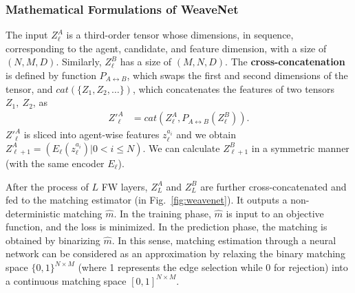 \subsubsection{Mathematical Formulations of WeaveNet}
The input $Z^A_\ell$ is a third-order tensor whose dimensions, in sequence, corresponding to the agent, candidate, and feature dimension, with a size of $(N, M, D)$.
Similarly, $Z^B_\ell$ has a size of $(M, N, D)$.
The {\bf cross-concatenation} is defined by function $P_{A\leftrightarrow B}$, which swaps the first and second dimensions of the tensor, and $cat(\{Z_1,Z_2,\ldots\})$, which concatenates the features of two tensors $Z_1,~Z_2$, as
\begin{equation}
\begin{split}
 Z'^A_\ell &= cat(Z^A_\ell,P_{A\leftrightarrow B}(Z^B_\ell)).
\end{split}
\end{equation}
$Z'^A_{\ell}$ is sliced into agent-wise features $z^{a_i}_\ell$ and we obtain $Z^A_{\ell+1} = (E_\ell(z^{a_i}_\ell)|0<i\leq N)$. We can calculate $Z^B_{\ell+1}$ in a symmetric manner (with the same encoder $E_\ell$).

After the process of $L$ FW layers, $Z^A_L$ and $Z^B_L$ are further cross-concatenated and fed to the matching estimator (in Fig.~\ref{fig:weavenet}). It outputs a non-deterministic matching $\hat{m}$.
In the training phase, $\hat{m}$ is input to an objective function, and the loss is minimized.
In the prediction phase, the matching is obtained by binarizing $\hat{m}$.
In this sense, matching estimation through a neural network can be considered as an approximation by relaxing the binary matching space $\{0,1\}^{N\times M}$ (where 1 represents the edge selection while 0 for rejection) into a continuous matching space $[0,1]^{N\times M}$.

